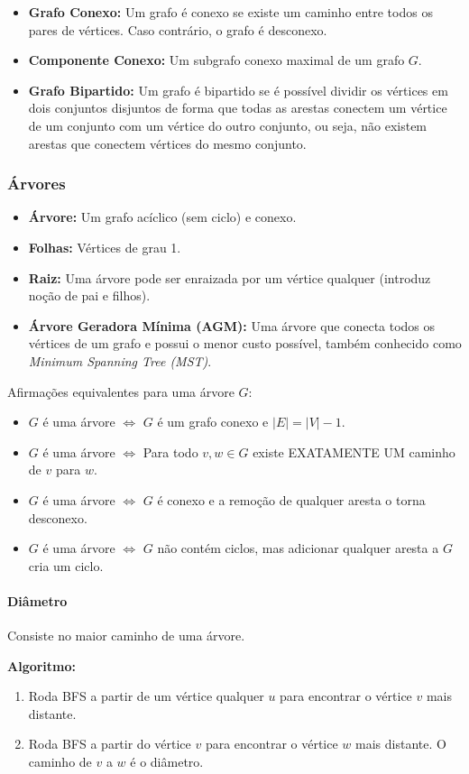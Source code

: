 \begin{itemize}\setlength\itemsep{0pt}
    \item \textbf{Grafo Conexo:} Um grafo é conexo se existe um caminho entre todos os pares de vértices. Caso contrário, o grafo é desconexo.
    \item \textbf{Componente Conexo:} Um subgrafo conexo maximal de um grafo $G$.
    \item \textbf{Grafo Bipartido:} Um grafo é bipartido se é possível dividir os vértices em dois conjuntos disjuntos de forma que todas as arestas conectem um vértice de um conjunto com um vértice do outro conjunto, ou seja, não existem arestas que conectem vértices do mesmo conjunto.
\end{itemize}

\subsubsection{Árvores}

\begin{itemize}\setlength\itemsep{0pt}
    \item \textbf{Árvore:} Um grafo acíclico (sem ciclo) e conexo.
    \item \textbf{Folhas:} Vértices de grau 1.
    \item \textbf{Raiz:} Uma árvore pode ser enraizada por um vértice qualquer (introduz noção de pai e filhos).
    \item \textbf{Árvore Geradora Mínima (AGM):} Uma árvore que conecta todos os vértices de um grafo e possui o menor custo possível, também conhecido como \textit{Minimum Spanning Tree (MST)}.
\end{itemize}

Afirmações equivalentes para uma árvore $G$:
\begin{itemize}\setlength\itemsep{0pt}
    \item $G$ é uma árvore $\iff$ $G$ é um grafo conexo e $|E| = |V| - 1$.
    \item $G$ é uma árvore $\iff$ Para todo $v, w \in G$ existe EXATAMENTE UM caminho de $v$ para $w$.
    \item $G$ é uma árvore $\iff$ $G$ é conexo e a remoção de qualquer aresta o torna desconexo.
    \item $G$ é uma árvore $\iff$ $G$ não contém ciclos, mas adicionar qualquer aresta a $G$ cria um ciclo.
\end{itemize}

\paragraph{Diâmetro}

Consiste no maior caminho de uma árvore.

\textbf{Algoritmo:}
\begin{enumerate}\setlength\itemsep{0pt}
    \item Roda BFS a partir de um vértice qualquer $u$ para encontrar o vértice $v$ mais distante.
    \item Roda BFS a partir do vértice $v$ para encontrar o vértice $w$ mais distante. O caminho de $v$ a $w$ é o diâmetro.
\end{enumerate}
